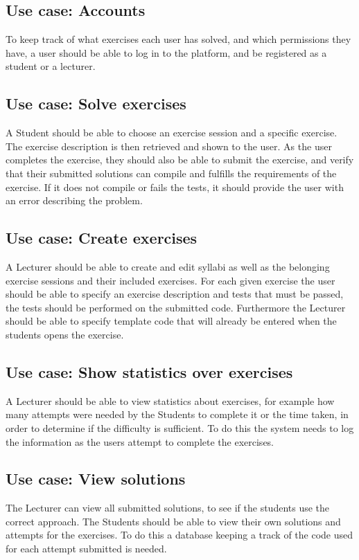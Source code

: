 \subsection*{Use case: Accounts}
To keep track of what exercises each user has solved, and which permissions they have, a user should be able to log in to the platform, and be registered as a student or a lecturer.

\subsection*{Use case: Solve exercises}
A Student should be able to choose an exercise session and a specific exercise. The exercise description is then retrieved and shown to the user.
As the user completes the exercise, they should also be able to submit the exercise, and verify that their submitted solutions can compile and fulfills the requirements of the exercise. If it does not compile or fails the tests, it should provide the user with an error describing the problem. 

\subsection*{Use case: Create exercises}
A Lecturer should be able to create and edit syllabi as well as the belonging exercise sessions and their included exercises. 
For each given exercise the user should be able to specify an exercise description and tests that must be passed, the tests should be performed on the submitted code. Furthermore the Lecturer should be able to specify template code that will already be entered when the students opens the exercise.

\subsection*{Use case: Show statistics over exercises}
A Lecturer should be able to view statistics about exercises, for example how many attempts were needed by the Students to complete it or the time taken, in order to determine if the difficulty is sufficient. To do this the system needs to log the information as the users attempt to complete the exercises.

\subsection*{Use case: View solutions}
The Lecturer can view all submitted solutions, to see if the students use the correct approach.
The Students should be able to view their own solutions and attempts for the exercises.
To do this a database keeping a track of the code used for each attempt submitted is needed. 


